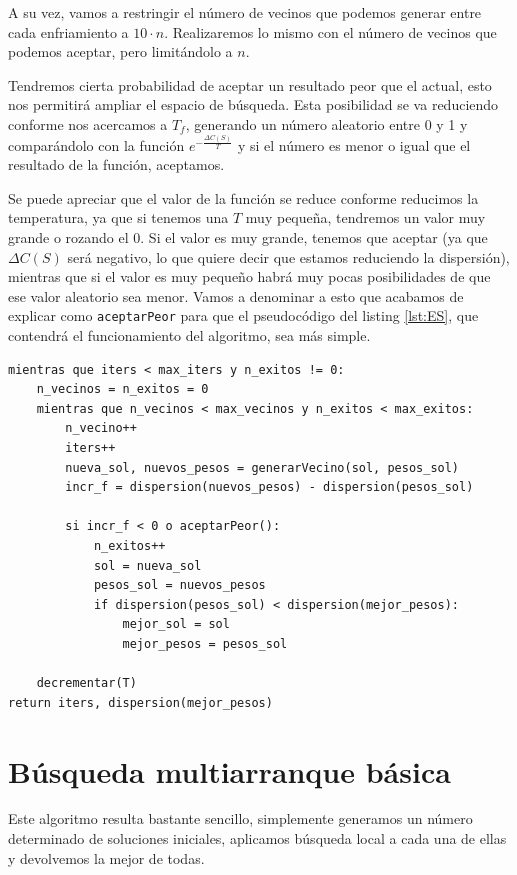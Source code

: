 A su vez, vamos a restringir el número de vecinos que podemos generar entre cada enfriamiento a $10 \cdot n$. Realizaremos lo mismo con el número de vecinos que podemos aceptar, pero limitándolo a $n$.

Tendremos cierta probabilidad de aceptar un resultado peor que el actual, esto nos permitirá ampliar el espacio de búsqueda.
Esta posibilidad se va reduciendo conforme nos acercamos a $T_f$, generando un número aleatorio entre 0 y 1 y comparándolo con la función $\displaystyle e^{-\frac{\Delta C(S)}{T}}$ y si el número es menor o igual que el resultado de la función, aceptamos.

Se puede apreciar que el valor de la función se reduce conforme reducimos la temperatura, ya que si tenemos una $T$ muy pequeña, tendremos un valor muy grande o rozando el 0. Si el valor es muy grande, tenemos que aceptar (ya que $\Delta C(S)$ será negativo, lo que quiere decir que estamos reduciendo la dispersión), mientras que si el valor es muy pequeño habrá muy pocas posibilidades de que ese valor aleatorio sea menor. Vamos a denominar a esto que acabamos de explicar como \texttt{aceptarPeor} para que el pseudocódigo del listing \ref{lst:ES}, que contendrá el funcionamiento del algoritmo, sea más simple.

\begin{lstlisting}[frame=single, caption={Enfriamiento simulado}, captionpos=b, label=lst:ES]
mientras que iters < max_iters y n_exitos != 0:
    n_vecinos = n_exitos = 0
    mientras que n_vecinos < max_vecinos y n_exitos < max_exitos:
        n_vecino++
        iters++
        nueva_sol, nuevos_pesos = generarVecino(sol, pesos_sol)
        incr_f = dispersion(nuevos_pesos) - dispersion(pesos_sol)
        
        si incr_f < 0 o aceptarPeor():
            n_exitos++
            sol = nueva_sol
            pesos_sol = nuevos_pesos         
            if dispersion(pesos_sol) < dispersion(mejor_pesos):
                mejor_sol = sol
                mejor_pesos = pesos_sol
                
    decrementar(T)
return iters, dispersion(mejor_pesos)
\end{lstlisting}


\section{Búsqueda multiarranque básica}

Este algoritmo resulta bastante sencillo, simplemente generamos un número determinado de soluciones iniciales, aplicamos búsqueda local a cada una de ellas y devolvemos la mejor de todas.

